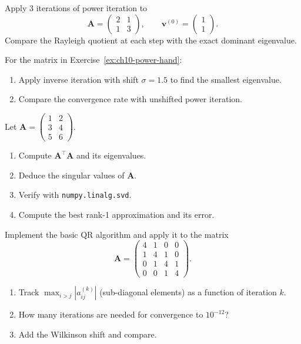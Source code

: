 \begin{exercise}[$\star$]
\label{ex:ch10-power-hand}
Apply 3 iterations of power iteration to
\[
    \mathbf{A} = \begin{pmatrix} 2 & 1 \\ 1 & 3 \end{pmatrix}, \qquad \mathbf{v}^{(0)} = \begin{pmatrix} 1 \\ 1 \end{pmatrix}.
\]
Compare the Rayleigh quotient at each step with the exact dominant eigenvalue.
\end{exercise}

\begin{exercise}[$\star\star$]
\label{ex:ch10-inverse-shift}
For the matrix in Exercise~\ref{ex:ch10-power-hand}:
\begin{enumerate}
    \item Apply inverse iteration with shift $\sigma = 1.5$ to find the smallest eigenvalue.
    \item Compare the convergence rate with unshifted power iteration.
\end{enumerate}
\end{exercise}

\begin{exercise}[$\star\star$]
\label{ex:ch10-svd-properties}
Let $\mathbf{A} = \begin{pmatrix} 1 & 2 \\ 3 & 4 \\ 5 & 6 \end{pmatrix}$.
\begin{enumerate}
    \item Compute $\mathbf{A}^\top\mathbf{A}$ and its eigenvalues.
    \item Deduce the singular values of $\mathbf{A}$.
    \item Verify with \texttt{numpy.linalg.svd}.
    \item Compute the best rank-1 approximation and its error.
\end{enumerate}
\end{exercise}

\begin{exercise}[$\star\star$]
\label{ex:ch10-qr-convergence}
Implement the basic QR algorithm and apply it to the matrix
\[
    \mathbf{A} = \begin{pmatrix} 4 & 1 & 0 & 0 \\ 1 & 4 & 1 & 0 \\ 0 & 1 & 4 & 1 \\ 0 & 0 & 1 & 4 \end{pmatrix}.
\]
\begin{enumerate}
    \item Track $\max_{i>j} |a_{ij}^{(k)}|$ (sub-diagonal elements) as a function of iteration $k$.
    \item How many iterations are needed for convergence to $10^{-12}$?
    \item Add the Wilkinson shift and compare.
\end{enumerate}
\end{exercise}

